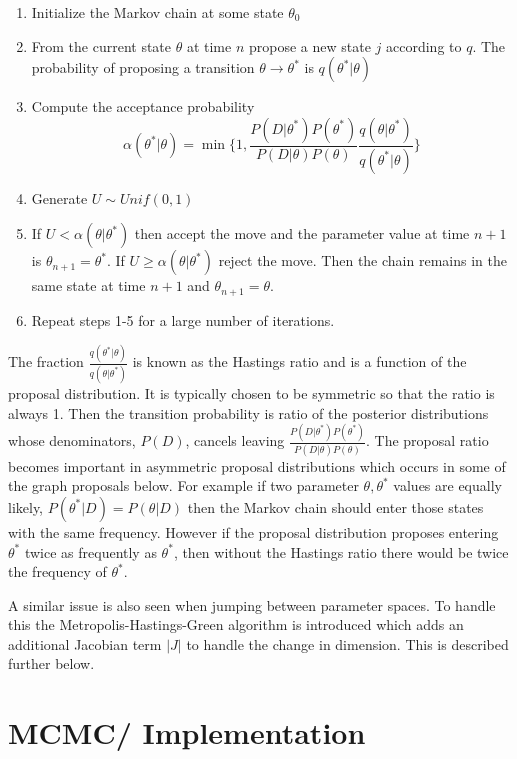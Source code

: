 \documentclass[]{article}
\numberwithin{equation}{section}
\begin{document}
\begin{enumerate}
\def\labelenumi{\arabic{enumi}.}
\item
  Initialize the Markov chain at some state \(\theta_0\)
\item
  From the current state \(\theta\) at time \(n\) propose a new state
  \(j\) according to \(q\). The probability of proposing a transition
  \(\theta \rightarrow \theta^*\) is \(q(\theta^*|\theta)\)
\item
  Compute the acceptance probability
  \[\alpha(\theta^*|\theta) = \min\{1, \frac{P(D|\theta^*)P(\theta^*)}{P(D|\theta)P(\theta)}\frac{q(\theta|\theta^*)}{q(\theta^*|\theta)} \}\]
\item
  Generate \(U \sim Unif(0,1)\)
\item
  If \(U < \alpha(\theta|\theta^*)\) then accept the move and the
  parameter value at time \(n+1\) is \(\theta_{n+1} = \theta^*\). If
  \(U \geq \alpha(\theta|\theta^*)\) reject the move. Then the chain
  remains in the same state at time \(n+1\) and
  \(\theta_{n+1} = \theta\).
\item
  Repeat steps 1-5 for a large number of iterations.
\end{enumerate}

The fraction \(\frac{q(\theta^*|\theta)}{q(\theta|\theta^*)}\) is known
as the Hastings ratio and is a function of the proposal distribution. It
is typically chosen to be symmetric so that the ratio is always 1. Then
the transition probability is ratio of the posterior distributions whose
denominators, \(P(D)\), cancels leaving
\(\frac{P(D|\theta^*)P(\theta^*)}{P(D|\theta)P(\theta)}\). The proposal
ratio becomes important in asymmetric proposal distributions which
occurs in some of the graph proposals below. For example if two
parameter \(\theta, \theta^*\) values are equally likely,
\(P(\theta^*|D) = P(\theta|D)\) then the Markov chain should enter those
states with the same frequency. However if the proposal distribution
proposes entering \(\theta^*\) twice as frequently as \(\theta^*\), then
without the Hastings ratio there would be twice the frequency of
\(\theta^*\).

A similar issue is also seen when jumping between parameter spaces. To
handle this the Metropolis-Hastings-Green algorithm is introduced which
adds an additional Jacobian term \(|J|\) to handle the change in
dimension. This is described further below.

\hypertarget{mcmc-implementation}{%
\section{MCMC/ Implementation}\label{mcmc-implementation}}
\end{document}
